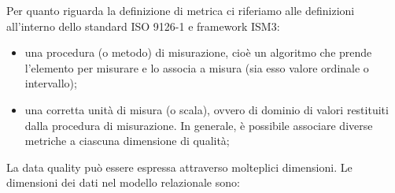 \documentclass[a4paper,12pt]{article}
\begin{document}
\noindent Per quanto riguarda la definizione di metrica ci riferiamo alle definizioni all'interno dello standard ISO 9126-1 e framework ISM3:
\begin{itemize}
	\item una procedura (o metodo) di misurazione, cioè un algoritmo che prende l'elemento per misurare e lo associa a misura (sia esso valore ordinale o intervallo); 
	\item una corretta unità di misura (o scala), ovvero di dominio di valori restituiti dalla procedura di misurazione. In generale, è possibile associare diverse metriche a ciascuna dimensione di qualità;
\end{itemize} 
La data quality può essere espressa attraverso molteplici dimensioni. Le dimensioni dei dati nel modello relazionale sono:
\end{document}
